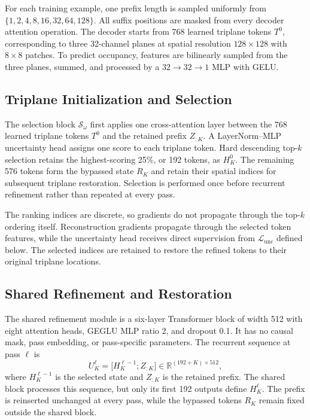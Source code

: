 For each training example, one prefix length is sampled uniformly from
$\{1,2,4,8,16,32,64,128\}$. All suffix positions are masked from every decoder
attention operation. The decoder starts from 768 learned triplane tokens
$T^0$, corresponding to three 32-channel planes at spatial resolution
$128\times128$ with $8\times8$ patches. To predict occupancy, features are
bilinearly sampled from the three planes, summed, and processed by a
$32\!\rightarrow\!32\!\rightarrow\!1$ MLP with GELU.

\subsection{Triplane Initialization and Selection}

The selection block $\mathcal{S}_{\omega}$ first applies one cross-attention
layer between the 768 learned triplane tokens $T^0$ and the retained prefix
$Z_{:K}$. A LayerNorm--MLP uncertainty head assigns one score to each triplane
token. Hard descending top-$k$ selection retains the highest-scoring 25\%, or
192 tokens, as $H_K^0$. The remaining 576 tokens form the bypassed state
$R_K$ and retain their spatial indices for subsequent triplane restoration.
Selection is performed once before recurrent refinement rather than repeated
at every pass.

The ranking indices are discrete, so gradients do not propagate through the
top-$k$ ordering itself. Reconstruction gradients propagate through the
selected token features, while the uncertainty head receives direct
supervision from $\mathcal{L}_{\mathrm{unc}}$ defined below. The selected
indices are retained to restore the refined tokens to their original triplane
locations.

\subsection{Shared Refinement and Restoration}

The shared refinement module is a six-layer Transformer block of width 512
with eight attention heads, GEGLU MLP ratio 2, and dropout 0.1. It has no
causal mask, pass embedding, or pass-specific parameters. The recurrent
sequence at pass $\ell$ is
\begin{equation}
U_K^{\ell}=
\bigl[H_K^{\ell-1};Z_{:K}\bigr]
\in\mathbb{R}^{(192+K)\times512},
\end{equation}
where $H_K^{\ell-1}$ is the selected state and $Z_{:K}$ is the retained prefix.
The shared block processes this sequence, but only its first 192 outputs define
$H_K^{\ell}$. The prefix is reinserted unchanged at every pass, while the
bypassed tokens $R_K$ remain fixed outside the shared block.

